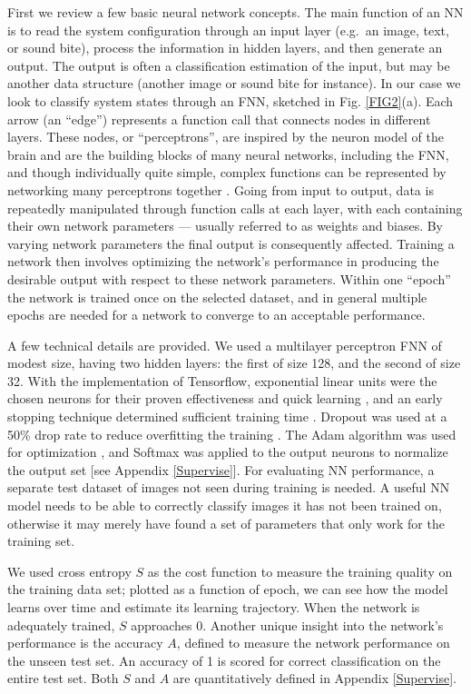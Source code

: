First we review a few basic neural network concepts.
The main function of an NN is to read the system configuration through an input layer (e.g.\ an image, text, or sound bite), process the information in  hidden layers, and then generate an output. The output is often a classification estimation of the input, but may be another data structure (another image or sound bite for instance). In our case we look to classify system states through an FNN, sketched in Fig. \ref{FIG2}(a).
Each arrow (an ``edge'') represents a function call that connects nodes in different layers. These nodes, or ``perceptrons'', are inspired by the neuron model of the brain and are the building blocks of many neural networks, including the FNN, and though individually quite simple, complex functions can be represented by networking many perceptrons together \cite{rosenblatt}.
Going from input to output, data is repeatedly manipulated through function calls at each layer, with each containing their own network parameters --- usually referred to as weights and biases.
By varying network parameters the final output is consequently affected.
Training a network then involves optimizing the network's performance in producing the desirable output with respect to these network parameters.
Within one ``epoch'' the network is trained once on the selected dataset, and in general multiple epochs are needed for a network to converge to an acceptable performance.

A few technical details are provided.
We used a multilayer perceptron FNN of modest size, having two hidden layers: the first of size 128, and the second of size 32.
With the implementation of Tensorflow, exponential linear units were the chosen neurons for their proven effectiveness and quick learning \cite{elu,tensorflow}, and an early stopping technique determined sufficient training time \cite{nntricks}. Dropout was used at a 50\% drop rate to reduce overfitting the training \cite{dropout}.
The Adam algorithm was used for optimization \cite{adam}, and Softmax was applied to the output neurons to normalize the output set [see Appendix \ref{Supervise}].
For evaluating NN performance, a separate test dataset of images not seen during training is needed. A useful NN model needs to be able to correctly classify images it has not been trained on, otherwise it may merely have found a set of parameters that only work for the training set.

We used cross entropy $S$ as the cost function to measure the training quality on the training data set;
plotted as a function of epoch, we can see how the model learns over time and estimate its learning trajectory.
When the network is adequately trained, $S$ approaches 0. Another unique insight into the network's performance is the accuracy $A$, defined to measure the network performance on the unseen test set. An accuracy of 1 is scored for correct classification on the entire test set. Both $S$ and $A$ are quantitatively defined in Appendix \ref{Supervise}.

